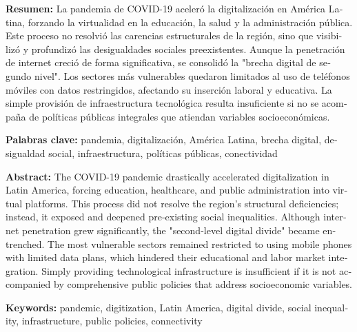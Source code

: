 \begin{tcolorbox}[colback=brown!8!white,colframe=brown!8!white,boxrule=0pt,arc=2pt,left=4pt,right=4pt,top=3pt,bottom=3pt,before skip=4pt,after skip=4pt]
\begin{otherlanguage}{spanish}
\sffamily\small \textbf{Resumen:} La pandemia de COVID-19 aceleró la digitalización en América Latina, forzando la virtualidad en la educación, la salud y la administración pública. Este proceso no resolvió las carencias estructurales de la región, sino que visibilizó y profundizó las desigualdades sociales preexistentes. Aunque la penetración de internet creció de forma significativa, se consolidó la "brecha digital de segundo nivel". Los sectores más vulnerables quedaron limitados al uso de teléfonos móviles con datos restringidos, afectando su inserción laboral y educativa. La simple provisión de infraestructura tecnológica resulta insuficiente si no se acompaña de políticas públicas integrales que atiendan variables socioeconómicas.
\par\smallskip\noindent\textbf{Palabras clave:} pandemia, digitalización, América Latina, brecha digital, desigualdad social, infraestructura, políticas públicas, conectividad
\end{otherlanguage}
\end{tcolorbox}

\begin{tcolorbox}[colback=brown!8!white,colframe=brown!8!white,boxrule=0pt,arc=2pt,left=4pt,right=4pt,top=3pt,bottom=3pt,before skip=4pt,after skip=4pt]
\begin{otherlanguage}{english}
\sffamily\small \textbf{Abstract:} The COVID-19 pandemic drastically accelerated digitalization in Latin America, forcing education, healthcare, and public administration into virtual platforms. This process did not resolve the region's structural deficiencies; instead, it exposed and deepened pre-existing social inequalities. Although internet penetration grew significantly, the "second-level digital divide" became entrenched. The most vulnerable sectors remained restricted to using mobile phones with limited data plans, which hindered their educational and labor market integration. Simply providing technological infrastructure is insufficient if it is not accompanied by comprehensive public policies that address socioeconomic variables.
\par\smallskip\noindent\textbf{Keywords:} pandemic, digitization, Latin America, digital divide, social inequality, infrastructure, public policies, connectivity
\end{otherlanguage}
\end{tcolorbox}

